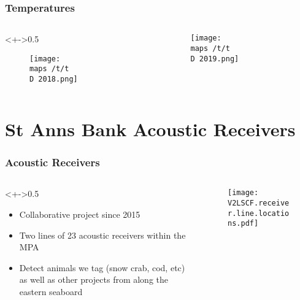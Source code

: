 \documentclass{beamer}
\begin{document}

\begin{frame}

\frametitle{Temperatures}
\begin{columns}
\begin{column}<+->{0.5\textwidth}
\vspace*{-0.5cm}
\begin{figure}
\centerline{\texttt{[image: \\maps /t/t\\D 2018.png]}}

\end{figure}
\end{column}

\begin{column}{0.5\textwidth}
\begin{figure}
\vspace*{-0.5cm}

\centerline{\texttt{[image: \\maps /t/t\\D 2019.png]}}

\end{figure}

\end{column}
\end{columns}
\end{frame}



\section{St Anns Bank Acoustic Receivers}

\begin{frame}
	
\frametitle{Acoustic Receivers}
\begin{columns}
	\begin{column}<+->{0.5\textwidth}
		\vspace*{-0.5cm}
		\begin{itemize}
			\item Collaborative project since 2015 
			\item Two lines of 23 acoustic receivers within the MPA
			\item Detect animals we tag (snow crab, cod, etc) as well as other projects from along the eastern seaboard
		\end{itemize}
	\end{column}
	
	\begin{column}{0.5\textwidth}
		\begin{figure}
			\vspace*{-0.5cm}
			
			\centerline{\texttt{[image: V2LSCF.receiver.line.locations.pdf]}}
			
		\end{figure}
		
	\end{column}
\end{columns}
\end{frame}
\end{document}
